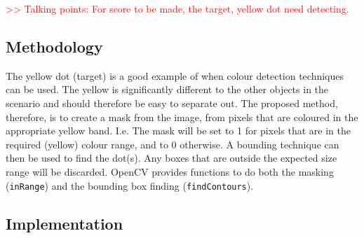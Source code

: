 \documentclass[final]{cmpreport_02}
\begin{document}
\textcolor{red}{>> Talking points: For score to be made, the target, yellow dot need detecting. }



\subsection{Methodology}

The yellow dot (target) is a good example of when colour detection techniques can be used. The yellow is significantly different to the other objects in the scenario and should therefore be easy to separate out. The proposed method, therefore, is to create a mask from the image, from pixels that are coloured in the appropriate yellow band. I.e. The mask will be set to 1 for pixels that are in the required (yellow) colour range, and to 0 otherwise. A bounding technique can then be used to find the dot(s). Any boxes that are outside the expected size range will be discarded. OpenCV provides functions to do both the masking (\verb|inRange|) and the bounding box finding (\verb|findContours|).
\\

\subsection{Implementation}
\end{document}
